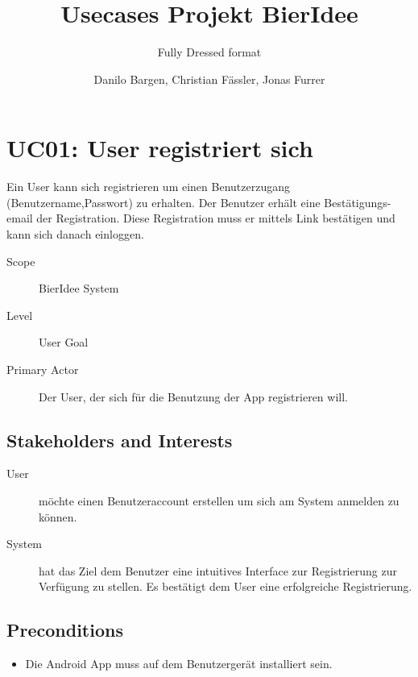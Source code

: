\documentclass[10pt,a4paper]{scrartcl}
\author{Danilo Bargen, Christian Fässler, Jonas Furrer}
\title{Usecases Projekt BierIdee}
\subtitle{Fully Dressed format}
\begin{document}
\begin{titlepage}
	\maketitle
	\vspace{120mm}
	\thispagestyle{empty} %
\end{titlepage}



\section*{UC01: User registriert sich }

Ein User kann sich registrieren um einen Benutzerzugang (Benutzername,Passwort) zu erhalten. Der Benutzer erhält eine Bestätigungs-email der Registration.
Diese Registration muss er mittels Link bestätigen und kann sich danach einloggen.



\begin{description}
\item[Scope] BierIdee System
\item[Level] User Goal
\item[Primary Actor] Der User, der sich für die Benutzung der App registrieren will.
\end{description}


\subsection*{Stakeholders and Interests}

\begin{description}
\item[User] möchte einen Benutzeraccount erstellen um sich am System anmelden zu können.
\item[System] hat das Ziel dem Benutzer eine intuitives Interface zur Registrierung zur Verfügung zu stellen. Es bestätigt dem User eine erfolgreiche Registrierung.
\end{description}


\subsection*{Preconditions}

\begin{itemize}
\item Die Android App muss auf dem Benutzergerät installiert sein.
\end{itemize}
\end{document}
